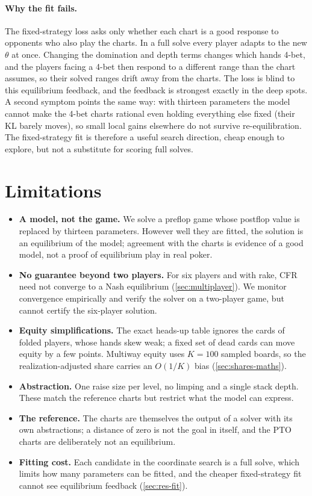 \paragraph{Why the fit fails.} The fixed-strategy loss asks only whether each chart is a good response to opponents who also play the charts. In a full solve every player adapts to the new $\theta$ at once. Changing the domination and depth terms changes which hands 4-bet, and the players facing a 4-bet then respond to a different range than the chart assumes, so their solved ranges drift away from the charts. The loss is blind to this equilibrium feedback, and the feedback is strongest exactly in the deep spots. A second symptom points the same way: with thirteen parameters the model cannot make the 4-bet charts rational even holding everything else fixed (their KL barely moves), so small local gains elsewhere do not survive re-equilibration. The fixed-strategy fit is therefore a useful search direction, cheap enough to explore, but not a substitute for scoring full solves.

\section{Limitations}\label{sec:res-limitations}

\begin{itemize}
  \item \textbf{A model, not the game.} We solve a preflop game whose postflop value is replaced by thirteen parameters. However well they are fitted, the solution is an equilibrium of the model; agreement with the charts is evidence of a good model, not a proof of equilibrium play in real poker.
  \item \textbf{No guarantee beyond two players.} For six players and with rake, CFR need not converge to a Nash equilibrium (\cref{sec:multiplayer}). We monitor convergence empirically and verify the solver on a two-player game, but cannot certify the six-player solution.
  \item \textbf{Equity simplifications.} The exact heads-up table ignores the cards of folded players, whose hands skew weak; a fixed set of dead cards can move equity by a few points. Multiway equity uses $K = 100$ sampled boards, so the realization-adjusted share carries an $O(1/K)$ bias (\cref{sec:shares-maths}).
  \item \textbf{Abstraction.} One raise size per level, no limping and a single stack depth. These match the reference charts but restrict what the model can express.
  \item \textbf{The reference.} The charts are themselves the output of a solver with its own abstractions; a distance of zero is not the goal in itself, and the PTO charts are deliberately not an equilibrium.
  \item \textbf{Fitting cost.} Each candidate in the coordinate search is a full solve, which limits how many parameters can be fitted, and the cheaper fixed-strategy fit cannot see equilibrium feedback (\cref{sec:res-fit}).
\end{itemize}

